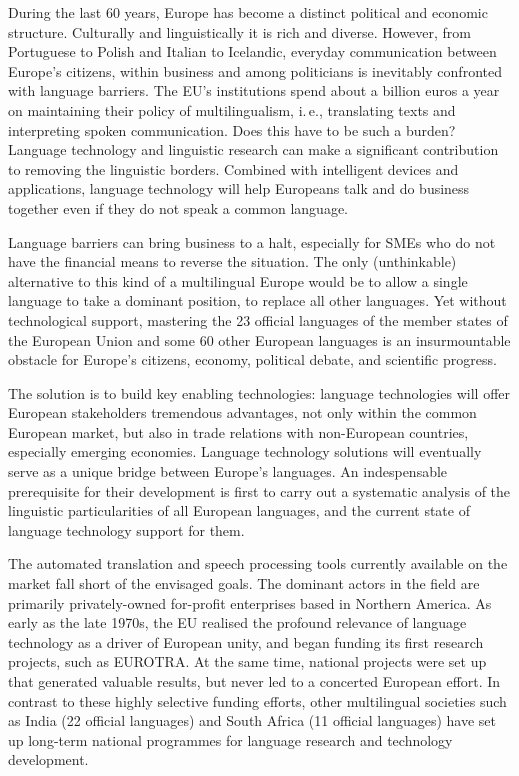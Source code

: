 \documentclass[]{../../metanetpaper}
\begin{document}
\vspace*{-4mm}
\begin{multicols}{2}
During the last 60 years, Europe has become a distinct political and economic structure. Culturally and linguistically it is rich and diverse. However, from Portuguese to Polish and Italian to Icelandic, everyday communication between Europe’s citizens, within business and among politicians is inevitably confronted with language barriers. The EU's institutions spend about a billion euros a year on maintaining their policy of multilingualism, i.\,e., translating texts and interpreting spoken communication. Does this have to be such a burden? Language technology and linguistic research can make a significant contribution to removing the linguistic borders. Combined with intelligent devices and applications, language technology will help Europeans talk and do business together even if they do not speak a common language. 


Language barriers can bring business to a halt, especially for SMEs who do not have the financial means to reverse the situation. The only (unthinkable) alternative to this kind of a multilingual Europe would be to allow a single language to take a dominant position, to replace all other languages. 
Yet without technological support, mastering the 23 official languages of the member states of the European Union and some 60 other European languages is an insurmountable obstacle for Europe’s citizens, economy, political debate, and scientific progress. 

The solution is to build key enabling technologies: language technologies will offer European stakeholders tremendous advantages, not only within the common European market, but also in trade relations with non-European countries, especially emerging economies. Language technology solutions will eventually serve as a unique bridge between Europe's languages. An indespensable prerequisite for their development is first to carry out a systematic analysis of the linguistic particularities of all European languages, and the current state of language technology support for them.  
    
The automated translation and speech processing tools currently available on the market fall short of the envisaged goals. The dominant actors in the field are primarily privately-owned for-profit enterprises based in Northern America. As early as the late 1970s, the EU realised the profound relevance of language technology as a driver of European unity, and began funding its first research projects, such as EUROTRA. At the same time, national projects were set up that generated valuable results, but never led to a concerted European effort. In contrast to these highly selective funding efforts, other multilingual societies such as India (22 official languages) and South Africa (11 official languages) have set up long-term national programmes for language research and technology development. 


\end{multicols}
\end{document}
